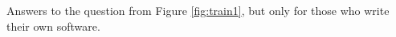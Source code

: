 \label{fig:crosstrain}

Answers to the question from Figure \ref{fig:train1}, but only for those who write their own software.